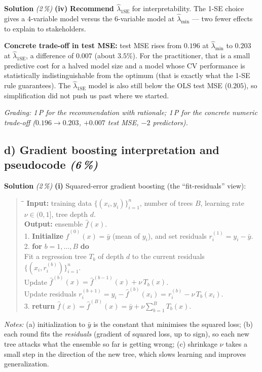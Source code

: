 \documentclass[11pt,a4paper]{article}
\newcommand{\subpoints}[1]{\textit{(#1\,\%)}}
\newcommand{\sol}{\noindent\textbf{Solution}}
\begin{document}
\medskip
\sol{} \subpoints{2} \textbf{(iv)} \textbf{Recommend $\hat\lambda_{1\mathrm{SE}}$} for interpretability.
The 1-SE choice gives a $4$-variable model versus the $6$-variable model at $\hat\lambda_{\min}$ ---
two fewer effects to explain to stakeholders.

\textbf{Concrete trade-off in test MSE:} test MSE rises from $0.196$ at $\hat\lambda_{\min}$ to
$0.203$ at $\hat\lambda_{1\mathrm{SE}}$, a difference of $0.007$ (about $3.5\%$). For the
practitioner, that is a small predictive cost for a halved model size and a model whose CV
performance is statistically indistinguishable from the optimum (that is exactly what the 1-SE
rule guarantees). The $\hat\lambda_{1\mathrm{SE}}$ model is also still below the OLS test MSE
($0.205$), so simplification did not push us past where we started.

\noindent\emph{Grading: 1\,P for the recommendation with rationale; 1\,P for the concrete numeric
trade-off ($0.196\to 0.203$, $+0.007$ test MSE, $-2$ predictors).}

\subsection*{d) Gradient boosting interpretation and pseudocode \subpoints{6}}

\sol{} \subpoints{2} \textbf{(i)} Squared-error gradient boosting (the ``fit-residuals'' view):
\begin{quote}\small
\begin{tabbing}
\hspace{1.5em}\=\hspace{1.5em}\=\kill
\textbf{Input:} training data $\{(x_i, y_i)\}_{i=1}^n$, number of trees $B$, learning rate $\nu \in (0,1]$, tree depth $d$.\\
\textbf{Output:} ensemble $\hat f(x)$.\\[2pt]
1. \textbf{Initialize} $\hat f^{(0)}(x) = \bar y$ (mean of $y_i$), and set residuals $r^{(1)}_i = y_i - \bar y$.\\
2. \textbf{for} $b = 1, \ldots, B$ \textbf{do}\\
 Fit a regression tree $T_b$ of depth $d$ to the current residuals $\{(x_i, r^{(b)}_i)\}_{i=1}^n$.\\
 Update $\hat f^{(b)}(x) = \hat f^{(b-1)}(x) + \nu\, T_b(x)$.\\
 Update residuals $r^{(b+1)}_i = y_i - \hat f^{(b)}(x_i) = r^{(b)}_i - \nu\, T_b(x_i)$.\\
3. \textbf{return} $\hat f(x) = \hat f^{(B)}(x) = \bar y + \nu \sum_{b=1}^B T_b(x)$.
\end{tabbing}
\end{quote}
\emph{Notes:} (a) initialization to $\bar y$ is the constant that minimises the squared loss; (b)
each round fits the \emph{residuals} (gradient of squared loss, up to sign), so each new tree
attacks what the ensemble so far is getting wrong; (c) shrinkage $\nu$ takes a small step in the
direction of the new tree, which slows learning and improves generalization.
\end{document}

